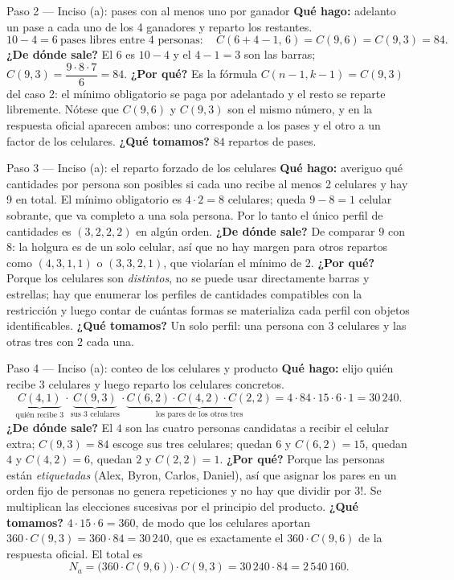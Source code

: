 \documentclass[11pt]{article}
\begin{document}
\begin{paso}{Paso 2 --- Inciso (a): pases con al menos uno por ganador}
\textbf{Qué hago:} adelanto un pase a cada uno de los 4 ganadores y reparto los restantes.
\[
10-4=6\ \text{pases libres entre 4 personas}:\quad C(6+4-1,\,6)=C(9,6)=C(9,3)=84 .
\]
\textbf{¿De dónde sale?} El $6$ es $10-4$ y el $4-1=3$ son las barras; $C(9,3)=\dfrac{9\cdot8\cdot7}{6}=84$.
\textbf{¿Por qué?} Es la fórmula $C(n-1,k-1)=C(9,3)$ del caso 2: el mínimo obligatorio se paga por adelantado y el resto se reparte libremente. Nótese que $C(9,6)$ y $C(9,3)$ son el mismo número, y en la respuesta oficial aparecen ambos: uno corresponde a los pases y el otro a un factor de los celulares.
\textbf{¿Qué tomamos?} $84$ repartos de pases.
\end{paso}

\begin{paso}{Paso 3 --- Inciso (a): el reparto forzado de los celulares}
\textbf{Qué hago:} averiguo qué cantidades por persona son posibles si cada uno recibe al menos 2 celulares y hay 9 en total.
El mínimo obligatorio es $4\cdot 2=8$ celulares; queda $9-8=1$ celular sobrante, que va completo a una sola persona. Por lo tanto el único perfil de cantidades es $(3,2,2,2)$ en algún orden.
\textbf{¿De dónde sale?} De comparar $9$ con $8$: la holgura es de un solo celular, así que no hay margen para otros repartos como $(4,3,1,1)$ o $(3,3,2,1)$, que violarían el mínimo de 2.
\textbf{¿Por qué?} Porque los celulares son \emph{distintos}, no se puede usar directamente barras y estrellas; hay que enumerar los perfiles de cantidades compatibles con la restricción y luego contar de cuántas formas se materializa cada perfil con objetos identificables.
\textbf{¿Qué tomamos?} Un solo perfil: una persona con $3$ celulares y las otras tres con $2$ cada una.
\end{paso}

\begin{paso}{Paso 4 --- Inciso (a): conteo de los celulares y producto}
\textbf{Qué hago:} elijo quién recibe 3 celulares y luego reparto los celulares concretos.
\[
\underbrace{C(4,1)}_{\text{quién recibe }3}\cdot\underbrace{C(9,3)}_{\text{sus 3 celulares}}\cdot\underbrace{C(6,2)\cdot C(4,2)\cdot C(2,2)}_{\text{los pares de los otros tres}}
=4\cdot 84\cdot 15\cdot 6\cdot 1=30\,240 .
\]
\textbf{¿De dónde sale?} El $4$ son las cuatro personas candidatas a recibir el celular extra; $C(9,3)=84$ escoge sus tres celulares; quedan $6$ y $C(6,2)=15$, quedan $4$ y $C(4,2)=6$, quedan $2$ y $C(2,2)=1$.
\textbf{¿Por qué?} Porque las personas están \emph{etiquetadas} (Alex, Byron, Carlos, Daniel), así que asignar los pares en un orden fijo de personas no genera repeticiones y no hay que dividir por $3!$. Se multiplican las elecciones sucesivas por el principio del producto.
\textbf{¿Qué tomamos?} $4\cdot 15\cdot 6=360$, de modo que los celulares aportan $360\cdot C(9,3)=360\cdot 84=30\,240$, que es exactamente el $360\cdot C(9,6)$ de la respuesta oficial. El total es
\[
N_a=\bigl(360\cdot C(9,6)\bigr)\cdot C(9,3)=30\,240\cdot 84=2\,540\,160 .
\]
\end{paso}
\end{document}
